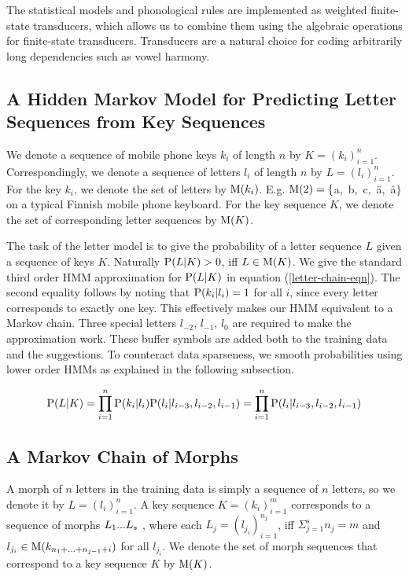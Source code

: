 \documentclass{llncs}
\begin{document}
The statistical models and phonological rules are implemented as
weighted finite-state transducers, which allows us to combine them using
the algebraic operations for finite-state transducers. Transducers are
a natural choice for coding arbitrarily long dependencies such as
vowel harmony.

\subsection{A Hidden Markov Model for Predicting Letter Sequences from Key Sequences}

We denote a sequence of mobile phone keys $k_i$ of length $n$ by $K =
(k_i)_{i=1}^{n}$. Correspondingly, we denote a sequence of letters
$l_i$ of length $n$ by $L = (l_i)_{i=1}^{n}$. For the key $k_i$, we
denote the set of letters by ${\rm M}(k_i)$. E.g. ${\rm M}(2) =
\{$a,~b,~c,~\"{a},~å$\}$ on a typical Finnish mobile phone
keyboard. For the key sequence $K$, we denote the set of corresponding
letter sequences by ${\rm M}(K)$.

The task of the letter model is to give the probability of a letter
sequence $L$ given a sequence of keys $K$. Naturally ${\rm P}(L|K) >
0$, iff $L \in {\rm M}(K)$. We give the standard third order HMM
approximation for ${\rm P}(L|K)$ in equation (\ref{letter-chain-eqn}).
The second equality follows by noting that ${\rm P}(k_i|l_i) = 1$ for
all $i$, since every letter corresponds to exactly one key. This
effectively makes our HMM equivalent to a Markov chain. Three special
letters $l_{-2}$, $l_{-1}$, $l_{0}$ are required to make the
approximation work. These buffer symbols are added both to the
training data and the suggestions. To counteract data sparseness, we
smooth probabilities using lower order HMMs as explained in the
following subsection.

\begin{equation}\label{letter-chain-eqn}
{\rm P}(L|K) = \prod_{i=1}^{n}{\rm P}(k_i|l_i){\rm P}(l_i|l_{i-3},l_{i-2},l_{i-1}) = \prod_{i=1}^{n}{\rm P}(l_i|l_{i-3},l_{i-2},l_{i-1})
\end{equation}

\subsection{A Markov Chain of Morphs}

A morph of $n$ letters in the training data is simply a sequence of $n$
letters, so we denote it by $L = (l_i)_{i=1}^{n}$. A key sequence $K =
(k_i)_{i=1}^{m}$ corresponds to a sequence of morphs $L_1{\rm
  ... }L_s$ , where each $L_j = (l_{j_i})_{i=1}^{n_j}$, iff $\Sigma_{j
  = 1}^{s} n_j = m$ and $l_{j_i} \in {\rm M}(k_{n_1 + {\rm ... } +
  n_{j - 1} + i})$ for all $l_{j_i}$. We denote the set of morph
sequences that correspond to a key sequence $K$ by ${\rm M}(K)$.
\end{document}
